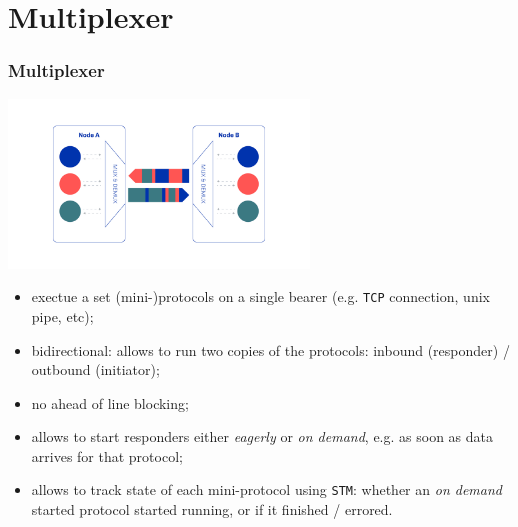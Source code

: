 \documentclass[t,dvipsnames,hyperref={colorlinks,citecolor=NavyBlue,linkcolor=NavyBlue,anchorcolor=NavyBlue,urlcolor=NavyBlue}]{beamer}
\begin{document}
\section{Multiplexer}

\begin{frame}
  \frametitle{Multiplexer}
  \vspace{-5mm}\small
  \begin{center}
  \includegraphics[width=8cm]{../images/multiplexer.png}
  \end{center}
  \vspace{-5mm}
  \begin{itemize}
    \item[\bullet] exectue a set (mini-)protocols on a single bearer (e.g. \texttt{TCP} connection, unix pipe, etc);
    \item[\bullet] bidirectional: allows to run two copies of the protocols: inbound (responder) / outbound (initiator);
    \item[\bullet] no ahead of line blocking;
    \item[\bullet] allows to start responders either \textit{eagerly} or \textit{on
      demand}, e.g. as soon as data arrives for that protocol;
    \item[\bullet] allows to track state of each mini-protocol using \texttt{STM}:
      whether an \textit{on demand} started protocol started running, or if it finished
      / errored.
  \end{itemize}
\end{frame}
\end{document}
